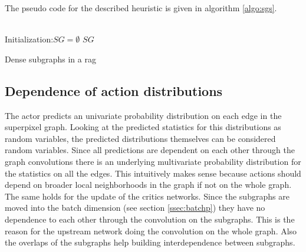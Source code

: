 The pseudo code for the described heuristic is given in algorithm \ref{algo:sgs}.\\
\vspace{8mm}\\
\begin{algorithm}[H]
	Initialization:$SG = \emptyset$\;
	\Return $SG$
	\caption{Dense subgraphs in a rag}
	\label{algo:sgs}
\end{algorithm}
\vspace{8mm}

\subsection{Dependence of action distributions}

The actor predicts an univariate probability distribution on each edge in the superpixel graph. Looking at the predicted statistics for this distributions as random variables, the predicted distributions themselves can be considered random variables. Since all predictions are dependent on each other through the graph convolutions there is an underlying multivariate probability distribution for the statistics on all the edges. This intuitively makes sense because actions should depend on broader local neighborhoods in the graph if not on the whole graph.\\
The same holds for the update of the critics networks. Since the subgraphs are moved into the batch dimension (see section \ref{ssec:batchp}) they have no dependence to each other through the convolution on the subgraphs. This is the reason for the upstream network doing the convolution on the whole graph. Also
the overlaps of the subgraphs help building interdependence between subgraphs.
